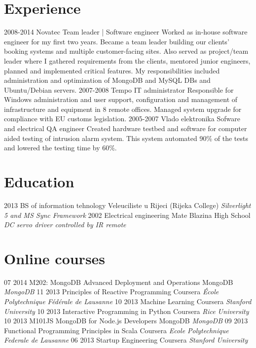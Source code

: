 \documentclass[]{cv}
\begin{document}
\section{Experience}

\begin{entrylist}
  \entry
    {2008-2014}
    {Novatec}
    {Team leader | Software engineer}
    {Worked as in-house software engineer for my first two years. Became a team leader building our clients' booking systems and multiple customer-facing sites. Also served as project/team leader where I gathered requirements from the clients, mentored junior engineers, planned and implemented critical features. My responsibilities included administration and optimization of MongoDB and MySQL DBs and Ubuntu/Debian servers.}
  \entry
    {2007-2008}
    {Tempo}
    {IT administrator}
    {Responsible for Windows administration and user support, configuration and management of infrastructure and equipment in 8 remote offices. Managed system upgrade for compliance with EU customs legislation.}
  \entry
    {2005-2007}
    {Vlado elektronika}
    {Sofware and electrical QA engineer}
    {Created hardware testbed and software for computer aided testing of intrusion alarm system. This system automated 90\% of the tests and lowered the testing time by 60\%.}
\end{entrylist}

\section{Education}

\begin{entrylist}
  \entry
    {2013}
    {BS of information tehnology}
    {Veleuciliste u Rijeci (Rijeka College)}
    {\emph{Silverlight 5 and MS Sync Framework}}
  \entry
    {2002}
    {Electrical engineering}
    {Mate Blazina High School}
    {\emph{DC servo driver controlled by IR remote}}
\end{entrylist}
\section{Online courses}
\begin{entrylist}
  \entry
    {07 2014} 
    {M202: MongoDB Advanced Deployment and Operations}
    {MongoDB}
    {\emph{MongoDB}}
  \entry
    {11 2013}
    {Principles of Reactive Programming}
    {Coursera}
    {\emph{École Polytechnique Fédérale de Lausanne}}
  \entry
    {10 2013}
    {Machine Learning} 
    {Coursera}
    {\emph{Stanford University}}
  \entry
    {10 2013}
    {Interactive Programming in Python}
    {Coursera}
    {\emph{Rice University}}
  \entry
    {10 2013}
    {M101JS MongoDB for Node.js Developers}
    {MongoDB}
    {\emph{MongoDB}}
  \entry
    {09 2013}
    {Functional Programming Principles in Scala}
    {Coursera}
    {\emph{Ecole Polytechnique Federale de Lausanne}}
  \entry
    {06 2013}
    {Startup Engineering}
    {Coursera}
    {\emph{Stanford University}}
\end{entrylist}
\end{document}
